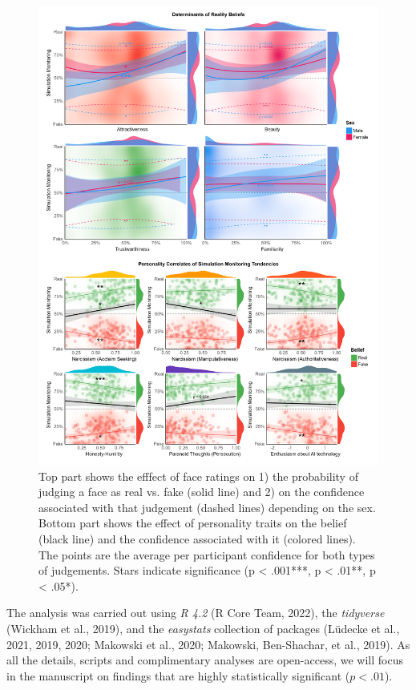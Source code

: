 \documentclass[
  man,mask,floatsintext]{apa6}
\begin{document}
\begin{figure}
\includegraphics[width=1\linewidth]{../figures/Figure2} \caption{Top part shows the efffect of face ratings on 1) the probability of judging a face as real vs. fake (solid line) and 2) on the confidence associated with that judgement (dashed lines) depending on the sex. Bottom part shows the effect of personality traits on the belief (black line) and the confidence associated with it (colored lines). The points are the average per participant confidence for both types of judgements. Stars indicate significance (p < .001***, p < .01**, p < .05*).}\label{fig:unnamed-chunk-3}
\end{figure}

The analysis was carried out using \emph{R 4.2} (R Core Team, 2022), the \emph{tidyverse} (Wickham et al., 2019), and the \emph{easystats} collection of packages (Lüdecke et al., 2021, 2019, 2020; Makowski et al., 2020; Makowski, Ben-Shachar, et al., 2019). As all the details, scripts and complimentary analyses are open-access, we will focus in the manuscript on findings that are highly statistically significant (\(p <.01\)).
\end{document}
